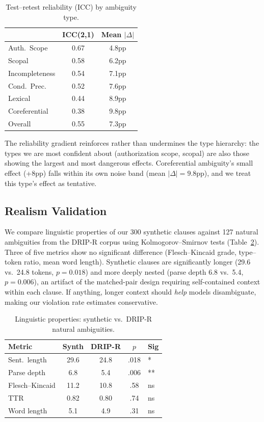 \documentclass[11pt,a4paper]{article}
\begin{document}
\begin{table}[t]
\centering
\small
\begin{tabular}{@{}lcc@{}}
\toprule
& \textbf{ICC(2,1)} & \textbf{Mean $|\Delta|$} \\
\midrule
Auth.\ Scope & 0.67 & 4.8pp \\
Scopal & 0.58 & 6.2pp \\
Incompleteness & 0.54 & 7.1pp \\
Cond.\ Prec. & 0.52 & 7.6pp \\
Lexical & 0.44 & 8.9pp \\
Coreferential & 0.38 & 9.8pp \\
\midrule
Overall & 0.55 & 7.3pp \\
\bottomrule
\end{tabular}
\caption{Test--retest reliability (ICC) by ambiguity type.}
\label{tab:reliability}
\end{table}

The reliability gradient reinforces rather than undermines the type hierarchy: the types we are most confident about (authorization scope, scopal) are also those showing the largest and most dangerous effects. Coreferential ambiguity's small effect (+8pp) falls within its own noise band (mean $|\Delta| = 9.8$pp), and we treat this type's effect as tentative.

\subsection{Realism Validation}

We compare linguistic properties of our 300 synthetic clauses against 127 natural ambiguities from the DRIP-R corpus using Kolmogorov--Smirnov tests (Table~\ref{tab:realism}). Three of five metrics show no significant difference (Flesch--Kincaid grade, type--token ratio, mean word length). Synthetic clauses are significantly longer (29.6 vs.\ 24.8 tokens, $p = 0.018$) and more deeply nested (parse depth 6.8 vs.\ 5.4, $p = 0.006$), an artifact of the matched-pair design requiring self-contained context within each clause. If anything, longer context should \emph{help} models disambiguate, making our violation rate estimates conservative.

\begin{table}[t]
\centering
\small
\begin{tabular}{@{}lcccl@{}}
\toprule
\textbf{Metric} & \textbf{Synth} & \textbf{DRIP-R} & \textbf{$p$} & \textbf{Sig} \\
\midrule
Sent.\ length & 29.6 & 24.8 & .018 & * \\
Parse depth & 6.8 & 5.4 & .006 & ** \\
Flesch--Kincaid & 11.2 & 10.8 & .58 & ns \\
TTR & 0.82 & 0.80 & .74 & ns \\
Word length & 5.1 & 4.9 & .31 & ns \\
\bottomrule
\end{tabular}
\caption{Linguistic properties: synthetic vs.\ DRIP-R natural ambiguities.}
\label{tab:realism}
\end{table}
\end{document}
